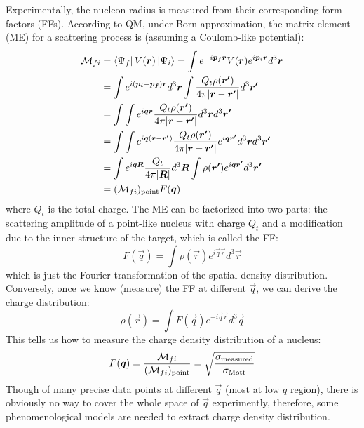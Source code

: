 Experimentally, the nucleon radius is measured from their corresponding form
factors (FFs). According to QM, under Born approximation, the matrix element (ME) 
for a scattering process is (assuming a Coulomb-like potential):
\begin{equation}
    \begin{aligned}
	\CM_{fi} &= \bra{\Psi_f}V(\vec{r})\ket{\Psi_i} 
		= \int e^{-i\vec{p}_f\vec{r}}V(\vec{r}) e^{i\vec{p}_i\vec{r}} d^3\vec{r}    \\	%
	    &= \int e^{i(\vec{p_i} - \vec{p_f})\vec{r}} d^3\vec{r} 
		\int \frac{Q_t\rho(\vec{r'})}{4\pi|\vec{r} - \vec{r'}|} d^3\vec{r'} \\	%
	    &= \int \int e^{i\vec{q} \vec{r} } 
		 \frac{Q_t \rho(\vec{r'})}{4\pi|\vec{r} - \vec{r'}|} d^3\vec{r} d^3\vec{r'} \\	%
	    &= \int\int e^{i\vec{q}(\vec{r} - \vec{r'})} 
		\frac{Q_t\rho(\vec{r'})}{4\pi|\vec{r} - \vec{r'}|} e^{i\vec{q}\vec{r'}} d^3\vec{r} d^3\vec{r'}   \\  %
	    &= \int e^{i\vec{q}\vec{R}} \frac{Q_t}{4\pi|\vec{R}|} d^3\vec{R} 
		\int \rho(\vec{r'}) e^{i\vec{q} \vec{r'}}d^3 \vec{r'}	\\  %
	    &= (\CM_{fi})_{\text{point}} F(\vec{q})   \\	%
    \end{aligned}
    \label{eqn:ME}
\end{equation}
where $Q_t$ is the total charge. The ME can be factorized into two parts: the 
scattering amplitude of a point-like nucleus with charge $Q_t$ and a modification
due to the inner structure of the target, which is called the FF:
\begin{equation}
    F(\vec{q}) = \int \rho(\vec{r}) e^{i\vec{q} \vec{r}} d^3\vec{r}
    \label{eqn:ff}
\end{equation}
which is just the Fourier transformation of the spatial density distribution.
Conversely, once we know (measure) the FF at different $\vec{q}$, we can
derive the charge distribution:
\begin{equation}
    \rho(\vec{r}) = \int F(\vec{q}) e^{-i\vec{q}\vec{r}} d^3\vec{q}
\end{equation}
This tells us how to measure the charge density distribution of a nucleus:
\begin{equation}
    F(\boldsymbol{q}) = \frac{\mathcal{M}_{fi}}{(\mathcal{M}_{fi})_{\text{point}}} 
	= \sqrt{\frac{\sigma_{\text{measured}}}{\sigma_{\text{Mott}}}}
\end{equation}
Though of many precise data points at different $\vec{q}$ (most at low $q$ region), 
there is obviously no way
to cover the whole space of $\vec{q}$ experimently, therefore, some phenomenological
models are needed to extract charge density distribution. 

